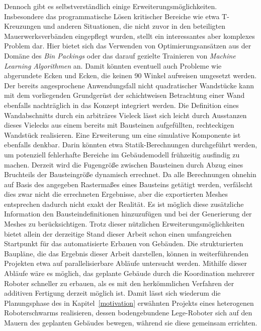 Dennoch gibt es selbstverständlich einige Erweiterungsmöglichkeiten.
Insbesondere das programmatische Lösen kritischer Bereiche wie etwa T-Kreuzungen und anderen Situationen, die nicht zuvor in den beteiligten Mauerwerksverbänden eingepflegt wurden, stellt ein interessantes aber komplexes Problem dar.
Hier bietet sich das Verwenden von Optimierungsansätzen aus der Domäne des \textit{Bin Packings} oder das darauf gezielte Trainieren von \textit{Machine Learning Algorithmen} an.
Damit könnten eventuell auch Probleme wie abgerundete Ecken und Ecken, die keinen 90\textdegree{} Winkel aufweisen umgesetzt werden.
Der bereits angesprochene Anwendungsfall nicht quadratischer Wandstücke kann mit dem vorliegenden Grundgerüst der schichtweisen Betrachtung einer Wand ebenfalls nachträglich in das Konzept integriert werden.
Die Definition eines Wandabschnitts durch ein arbiträres Vieleck lässt sich leicht durch \glqq{}Ausstanzen\grqq{} dieses Vielecks aus einem bereits mit Bausteinen aufgefüllten, rechteckigen Wandstück realisieren.
Eine Erweiterung um eine simulative Komponente ist ebenfalls denkbar.
Darin könnten etwa Statik-Berechnungen durchgeführt werden, um potenziell fehlerhafte Bereiche im Gebäudemodell frühzeitig ausfindig zu machen.
Derzeit wird die Fugengröße zwischen Bausteinen durch Abzug eines Bruchteils der Bausteingröße dynamisch errechnet.
Da alle Berechnungen ohnehin auf Basis des angegeben Rastermaßes eines Bausteins getätigt werden, verfälscht dies zwar nicht die errechneten Ergebnisse, aber die exportierten Meshes entsprechen dadurch nicht exakt der Realität.
Es ist möglich diese zusätzliche Information den Bausteindefinitionen hinzuzufügen und bei der Generierung der Meshes zu berücksichtigen.
Trotz dieser nützlichen Erweiterungsmöglichkeiten bietet allein der derzeitige Stand dieser Arbeit schon einen umfangreichen Startpunkt für das automatisierte Erbauen von Gebäuden.
Die strukturierten Baupläne, die das Ergebnis dieser Arbeit darstellen, können in weiterführenden Projekten etwa auf parallelisierbare Abläufe untersucht werden.
Mithilfe dieser Abläufe wäre es möglich, das geplante Gebäude durch die Koordination mehrerer Roboter schneller zu erbauen, als es mit den herkömmlichen Verfahren der additiven Fertigung derzeit möglich ist.
Damit lässt sich wiederum die Planungsphase des in Kapitel~\ref{motivation} erwähnten Projekts eines heterogenen Roboterschwarms realisieren, dessen bodengebundene Lege-Roboter sich auf den Mauern des geplanten Gebäudes bewegen, während sie diese gemeinsam errichten.
